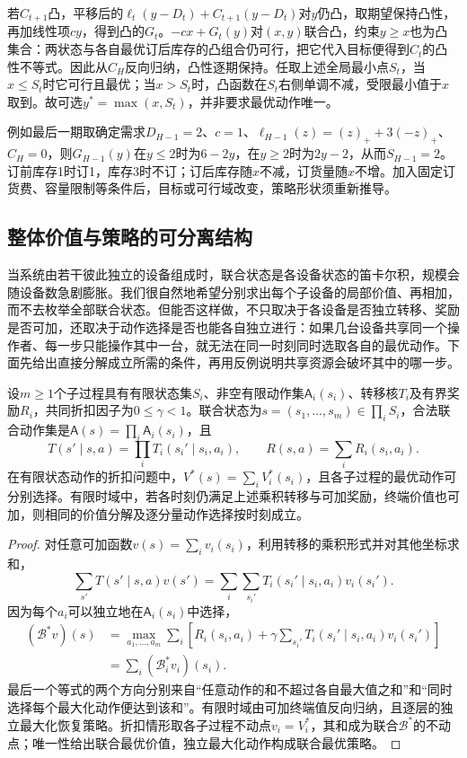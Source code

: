 若$C_{t+1}$凸，平移后的$\ell_t(y-D_t)+C_{t+1}(y-D_t)$对$y$仍凸，取期望保持凸性，再加线性项$cy$，得到凸的$G_t$。$-cx+G_t(y)$对$(x,y)$联合凸，约束$y\geq x$也为凸集合：两状态与各自最优订后库存的凸组合仍可行，把它代入目标便得到$C_t$的凸性不等式。因此从$C_H$反向归纳，凸性逐期保持。任取上述全局最小点$S_t$，当$x\leq S_t$时它可行且最优；当$x>S_t$时，凸函数在$S_t$右侧单调不减，受限最小值于$x$取到。故可选$y^*=\max(x,S_t)$，并非要求最优动作唯一。

例如最后一期取确定需求$D_{H-1}=2$、$c=1$、$\ell_{H-1}(z)=(z)_++3(-z)_+$、$C_H=0$，则$G_{H-1}(y)$在$y\leq2$时为$6-2y$，在$y\geq2$时为$2y-2$，从而$S_{H-1}=2$。订前库存1时订1，库存3时不订；订后库存随$x$不减，订货量随$x$不增。加入固定订货费、容量限制等条件后，目标或可行域改变，策略形状须重新推导。

\subsection{整体价值与策略的可分离结构}
\label{sec:rl-planning-separable}

当系统由若干彼此独立的设备组成时，联合状态是各设备状态的笛卡尔积，规模会随设备数急剧膨胀。我们很自然地希望分别求出每个子设备的局部价值、再相加，而不去枚举全部联合状态。但能否这样做，不只取决于各设备是否独立转移、奖励是否可加，还取决于动作选择是否也能各自独立进行：如果几台设备共享同一个操作者、每一步只能操作其中一台，就无法在同一时刻同时选取各自的最优动作。下面先给出直接分解成立所需的条件，再用反例说明共享资源会破坏其中的哪一步。

\begin{theorem}[独立子过程的可分离性]
 \label{thm:rl-planning-separable}
 设$m\geq1$个子过程具有有限状态集$S_i$、非空有限动作集$\mathsf A_i(s_i)$、转移核$T_i$及有界奖励$R_i$，共同折扣因子为$0\leq\gamma<1$。联合状态为$s=(s_1,\ldots,s_m)\in\prod_i S_i$，合法联合动作集是$\mathsf A(s)=\prod_i\mathsf A_i(s_i)$，且
 \[
 T(s'\mid s,a)=\prod_iT_i(s_i'\mid s_i,a_i),\qquad
 R(s,a)=\sum_iR_i(s_i,a_i).
 \]
 在有限状态动作的折扣问题中，$V^*(s)=\sum_iV_i^*(s_i)$，且各子过程的最优动作可分别选择。有限时域中，若各时刻仍满足上述乘积转移与可加奖励，终端价值也可加，则相同的价值分解及逐分量动作选择按时刻成立。
\end{theorem}
\begin{proof}
 对任意可加函数$v(s)=\sum_i v_i(s_i)$，利用转移的乘积形式并对其他坐标求和，
 \[
 \sum_{s'}T(s'\mid s,a)v(s')
 =\sum_i\sum_{s_i'}T_i(s_i'\mid s_i,a_i)v_i(s_i').
 \]
 因为每个$a_i$可以独立地在$\mathsf A_i(s_i)$中选择，
 \[
 \begin{aligned}
 (\mathcal B^*v)(s)
 &=\max_{a_1,\ldots,a_m}\sum_i
   \left[R_i(s_i,a_i)+\gamma\sum_{s_i'}T_i(s_i'\mid s_i,a_i)v_i(s_i')\right]\\
 &=\sum_i(\mathcal B_i^*v_i)(s_i).
 \end{aligned}
 \]
 最后一个等式的两个方向分别来自“任意动作的和不超过各自最大值之和”和“同时选择每个最大化动作便达到该和”。有限时域由可加终端值反向归纳，且逐层的独立最大化恢复策略。折扣情形取各子过程不动点$v_i=V_i^*$，其和成为联合$\mathcal B^*$的不动点；唯一性给出联合最优价值，独立最大化动作构成联合最优策略。
\end{proof}


